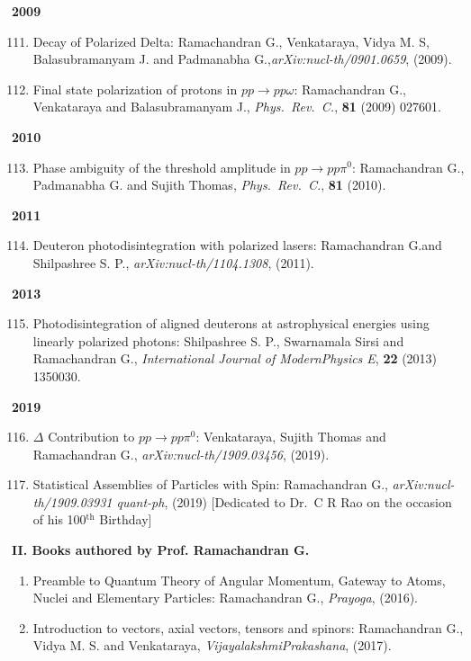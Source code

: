 \textbf{2009}
\begin{enumerate}
\setcounter{enumi}{110}
\item Decay of Polarized Delta: Ramachandran G., Venkataraya, Vidya M. S, Balasubramanyam J. and Padmanabha G.,\hfil\break \textit{arXiv:nucl-th/0901.0659}, (2009).
\item Final state polarization of protons in $pp\to pp\omega$: Ramachandran G., Venkataraya and Balasubramanyam J., \textit{Phys.\ Rev.\ C.}, {\bf 81} (2009) 027601.
\end{enumerate}
\textbf{2010}
\begin{enumerate}
\setcounter{enumi}{112}
\item Phase ambiguity of the threshold amplitude in $pp \to pp\pi^{0}$: Ramachandran G., Padmanabha G. and Sujith Thomas, \textit{Phys.\ Rev.\ C.}, {\bf 81} (2010).
\end{enumerate}
\textbf{2011}
\begin{enumerate}
\setcounter{enumi}{113}
\item Deuteron photodisintegration with polarized lasers: Ramachandran G.and Shilpashree S. P., \textit{arXiv:nucl-th/1104.1308}, (2011).
\end{enumerate}
\textbf{2013}
\begin{enumerate}
\setcounter{enumi}{114}
\item Photodisintegration of aligned deuterons at astrophysical energies using linearly polarized photons: Shilpashree S. P., Swarnamala Sirsi and Ramachandran G., \textit{International Journal of Modern\break Physics E}, {\bf 22} (2013) 1350030.
\end{enumerate}
\textbf{2019}
\begin{enumerate}
\setcounter{enumi}{115}
\item $\Delta$ Contribution to $pp\to pp\pi^{0}$: Venkataraya, Sujith Thomas and Ramachandran G., \textit{arXiv:nucl-th/1909.03456}, (2019).
\item Statistical Assemblies of Particles with Spin: Ramachandran G., \textit{arXiv:nucl-th/1909.03931 quant-ph}, (2019) [Dedicated to Dr.\ C R Rao on the occasion of his 100$^{\text{th}}$ Birthday]
\end{enumerate}

\noindent
\textbf{II. Books authored by Prof. Ramachandran G.}
\begin{enumerate}
\item Preamble to Quantum Theory of Angular Momentum, Gateway to Atoms, Nuclei and Elementary Particles: Ramachandran G., \textit{Prayoga}, (2016).
\item Introduction to vectors, axial vectors, tensors and spinors: Ramachandran G., Vidya M. S. and Venkataraya, \textit{Vijayalakshmi\break Prakashana}, (2017).
\end{enumerate}
